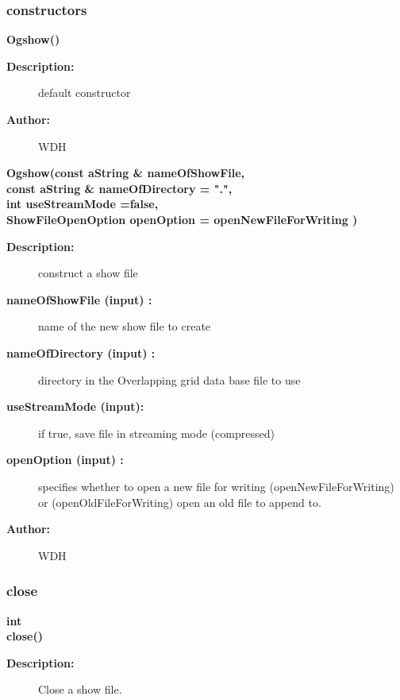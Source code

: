 \subsubsection{constructors}
 
\newlength{\OgshowIncludeArgIndent}
\begin{flushleft} \textbf{%
\settowidth{\OgshowIncludeArgIndent}{Ogshow(}%
Ogshow()
}\end{flushleft}
\begin{description}
\item[{\bf Description:}] 
  default constructor
\item[{\bf Author:}]  WDH
\end{description}

 
\begin{flushleft} \textbf{%
\settowidth{\OgshowIncludeArgIndent}{Ogshow(}%
Ogshow(const aString \& nameOfShowFile, \\ 
\hspace{\OgshowIncludeArgIndent}const aString \& nameOfDirectory  = ".",\\ 
\hspace{\OgshowIncludeArgIndent}int useStreamMode  =false,\\ 
\hspace{\OgshowIncludeArgIndent}ShowFileOpenOption openOption = openNewFileForWriting )
}\end{flushleft}
\begin{description}
\item[{\bf Description:}] 
  construct a show file
\item[{\bf nameOfShowFile (input) :}]  name of the new show file to create
\item[{\bf nameOfDirectory (input) :}]  directory in the Overlapping grid data base file to use
\item[{\bf useStreamMode (input):}]  if true, save file in streaming mode (compressed)
\item[{\bf openOption (input) :}]  specifies whether to open a new file for writing (openNewFileForWriting) or
    (openOldFileForWriting) open an old file to append to. 
\item[{\bf Author:}]  WDH
\end{description}
\subsubsection{close}
 
\begin{flushleft} \textbf{%
int  \\ 
\settowidth{\OgshowIncludeArgIndent}{close(}%
close()
}\end{flushleft}
\begin{description}
\item[{\bf Description:}] 
     Close a show file.
\end{description}
